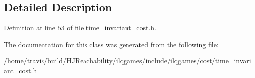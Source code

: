 \subsection{Detailed Description}


Definition at line 53 of file time\+\_\+invariant\+\_\+cost.\+h.



The documentation for this class was generated from the following file\+:\begin{DoxyCompactItemize}
\item 
/home/travis/build/\+H\+J\+Reachability/ilqgames/include/ilqgames/cost/time\+\_\+invariant\+\_\+cost.\+h\end{DoxyCompactItemize}
